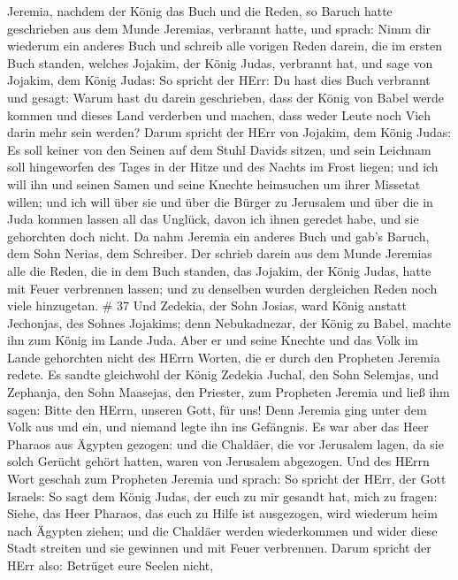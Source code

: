 Jeremia, nachdem der König das Buch und die Reden, so Baruch hatte
geschrieben aus dem Munde Jeremias, verbrannt hatte, und sprach:
 Nimm dir wiederum ein anderes Buch und schreib alle
vorigen Reden darein, die im ersten Buch standen, welches Jojakim, der
König Judas, verbrannt hat,  und sage von Jojakim, dem
König Judas: So spricht der HErr: Du hast dies Buch verbrannt und
gesagt: Warum hast du darein geschrieben, dass der König von Babel werde
kommen und dieses Land verderben und machen, dass weder Leute noch Vieh
darin mehr sein werden?  Darum spricht der HErr von
Jojakim, dem König Judas: Es soll keiner von den Seinen auf dem Stuhl
Davids sitzen, und sein Leichnam soll hingeworfen des Tages in der Hitze
und des Nachts im Frost liegen;  und ich will ihn und
seinen Samen und seine Knechte heimsuchen um ihrer Missetat willen; und
ich will über sie und über die Bürger zu Jerusalem und über die in Juda
kommen lassen all das Unglück, davon ich ihnen geredet habe, und sie
gehorchten doch nicht.  Da nahm Jeremia ein anderes Buch
und gab's Baruch, dem Sohn Nerias, dem Schreiber. Der schrieb darein aus
dem Munde Jeremias alle die Reden, die in dem Buch standen, das Jojakim,
der König Judas, hatte mit Feuer verbrennen lassen; und zu denselben
wurden dergleichen Reden noch viele hinzugetan. \# 37  Und
Zedekia, der Sohn Josias, ward König anstatt Jechonjas, des Sohnes
Jojakims; denn Nebukadnezar, der König zu Babel, machte ihn zum König im
Lande Juda.  Aber er und seine Knechte und das Volk im Lande
gehorchten nicht des HErrn Worten, die er durch den Propheten Jeremia
redete.  Es sandte gleichwohl der König Zedekia Juchal, den
Sohn Selemjas, und Zephanja, den Sohn Maasejas, den Priester, zum
Propheten Jeremia und ließ ihm sagen: Bitte den HErrn, unseren Gott, für
uns!  Denn Jeremia ging unter dem Volk aus und ein, und
niemand legte ihn ins Gefängnis.  Es war aber das Heer
Pharaos aus Ägypten gezogen: und die Chaldäer, die vor Jerusalem lagen,
da sie solch Gerücht gehört hatten, waren von Jerusalem abgezogen.
 Und des HErrn Wort geschah zum Propheten Jeremia und
sprach:  So spricht der HErr, der Gott Israels: So sagt dem
König Judas, der euch zu mir gesandt hat, mich zu fragen: Siehe, das
Heer Pharaos, das euch zu Hilfe ist ausgezogen, wird wiederum heim nach
Ägypten ziehen;  und die Chaldäer werden wiederkommen und
wider diese Stadt streiten und sie gewinnen und mit Feuer verbrennen.
 Darum spricht der HErr also: Betrüget eure Seelen nicht,

